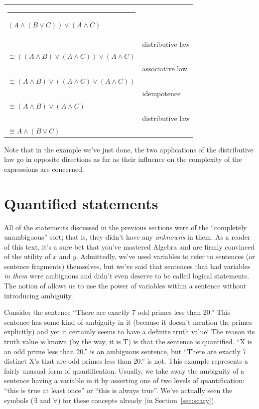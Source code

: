 \begin{center}
\begin{tabular}{p{2in}p{2in}}
\rule{10pt}{0pt} $(A \land (B \lor C)) \lor (A \land C)$ & \\
 & distributive law\\
$\cong  ((A \land B) \lor (A \land C)) \lor (A \land C)$ & \\
 & associative law\\
$\cong  (A \land B) \lor ((A \land C) \lor (A \land C))$ & \\
 & idempotence \\
$\cong (A \land B) \lor (A \land C) $ & \\
 & distributive law\\
$\cong A \land (B \lor C)$ & \\
\end{tabular}
\end{center}
\medskip

Note that in the example we've just done, the two applications
of the distributive law go in opposite directions as far as their
influence on the complexity of the expressions are concerned.

\clearpage






\newpage

\section{Quantified statements}
\label{sec:quant}

All of the statements discussed in the previous sections were of the 
``completely unambiguous'' sort; that is, they didn't have any {\em unknowns}  
in them.  As a reader of this text, it's a sure bet that you've mastered
Algebra and are firmly convinced of the utility of $x$ and $y$.  Admittedly,
we've used variables to refer to sentences (or sentence fragments) themselves,
but we've said that sentences that had variables {\em in them} were ambiguous 
and didn't even deserve to be called logical statements.  The notion 
of  
allows us to use the power of variables within a
sentence without introducing ambiguity.

Consider the sentence ``There are exactly 7 odd primes less than 20.''  
This sentence has some kind of ambiguity in it (because it doesn't mention
the primes explicitly) and yet it certainly seems to have a definite 
truth value!  The reason its truth value is known (by the way, it is T)
is that the sentence is quantified.  ``X is an odd prime less than 20.'' 
is an ambiguous sentence, but ``There are exactly 7 distinct X's that
are odd primes less than 20.'' is not.  This example represents a fairly
unusual form of quantification.  Usually, we take away the ambiguity
of a sentence having a variable in it by asserting one of two levels 
of quantification: ``this is true at least once'' or ``this is always true''.  
We've actually seen the symbols ($\exists$ and $\forall$) for these 
concepts already (in Section~\ref{sec:scary}).  

